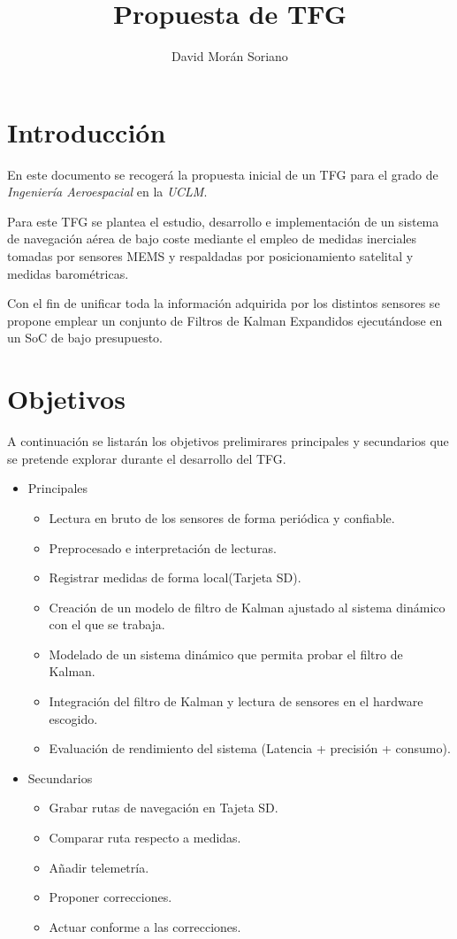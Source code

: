 \documentclass{sty/propuesta}
\title{Propuesta de TFG}
\author{David Morán Soriano}
\begin{document}
\maketitle
\tableofcontents
\newpage

\section{Introducción}
En este documento se recogerá la propuesta inicial de un TFG para el grado de \emph{Ingeniería Aeroespacial} en la \emph{UCLM}.

Para este TFG se plantea el estudio, desarrollo e implementación de un sistema de navegación aérea de bajo coste mediante el empleo de medidas inerciales tomadas por sensores MEMS y respaldadas por posicionamiento satelital y medidas barométricas.

Con el fin de unificar toda la información adquirida por los distintos sensores se propone emplear un conjunto de Filtros de Kalman Expandidos ejecutándose en un SoC de bajo presupuesto.


\section{Objetivos}
A continuación se listarán los objetivos prelimirares principales y secundarios que se pretende explorar durante el desarrollo del TFG.
\begin{itemize}
    \item Principales
    \begin{itemize}
        \item Lectura en bruto de los sensores de forma periódica y confiable.
        \item Preprocesado e interpretación de lecturas.
        \item Registrar medidas de forma local(Tarjeta SD).
        \item Creación de un modelo de filtro de Kalman ajustado al sistema dinámico con el que se trabaja.
        \item Modelado de un sistema dinámico que permita probar el filtro de Kalman.
        \item Integración del filtro de Kalman y lectura de sensores en el hardware escogido.
        \item Evaluación de rendimiento del sistema (Latencia + precisión + consumo).
    \end{itemize}
    \item Secundarios
    \begin{itemize}
        \item Grabar rutas de navegación en Tajeta SD.
        \item Comparar ruta respecto a medidas.
        \item Añadir telemetría.
        \item Proponer correcciones.
        \item Actuar conforme a las correcciones.
    \end{itemize}
\end{itemize}
\end{document}

